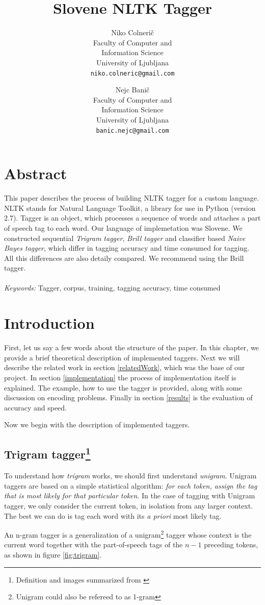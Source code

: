 \documentclass[10pt, conference, compsocconf]{IEEEtran}
\title{Slovene NLTK Tagger}
\author{
	Niko Colnerič \\
	\footnotesize Faculty of Computer and \\
	\footnotesize Information Science \\
	\footnotesize University of Ljubljana \\
	\footnotesize \texttt{niko.colneric@gmail.com} \\
	\and
	Nejc Banič \\
	\footnotesize Faculty of Computer and \\
	\footnotesize Information Science \\
	\footnotesize University of Ljubljana \\
	\footnotesize \texttt{banic.nejc@gmail.com} \\
}
\begin{document}
\maketitle
\thispagestyle{empty}

\section*{Abstract} %
This paper describes the process of building NLTK tagger for a custom language. NLTK stands for Natural Language Toolkit, a library for use in Python (version 2.7).
Tagger is an object, which processes a sequence of words and attaches a part of speech tag to each word.
Our language of implemetation was Slovene.
We constructed sequential \textit{Trigram tagger}, \textit{Brill tagger} and classifier based \textit{Naive Bayes tagger}, which differ in tagging accuracy and time consumed for tagging. All this differences are also detaily compared. We recommend using the Brill tagger. 
\\\\
\textit{Keywords:} Tagger, corpus, training, tagging accuracy, time consumed

\section{Introduction} %
First, let us say a few words about the structure of the paper. In this chapter, we provide a brief theoretical description of implemented taggers. Next we will describe the related work in section \ref{relatedWork}, which was the base of our project. In section \ref{implementation} the process of implementation itself is explained. The example, how to use the tagger is provided, along with some discussion on encoding problems. Finally in section \ref{results} is the evaluation of accuracy and speed.
\par
Now we begin with the description of implemented taggers.

\subsection[Trigram tagger]{Trigram tagger\footnote{Definition and images summarized from \cite{NLTKBOOK}}}
To understand how \textit{trigram} works, we should first understand \textit{unigram}.
Unigram taggers are based on a simple statistical algorithm: \textit{for each token, assign the tag that is most likely for that particular token}.
In the case of tagging with Unigram tagger, we only consider the current token, in isolation from any larger context. The best we can do is tag each word with its \textit{a priori} most likely tag.
\par
An n-gram tagger is a generalization of a unigram\footnote{Unigram could also be refereed to as 1-gram} tagger whose context is the current word together with the part-of-speech tags of the $n-1$ preceding tokens, as shown in figure \ref{fig:trigram}.
\end{document}
